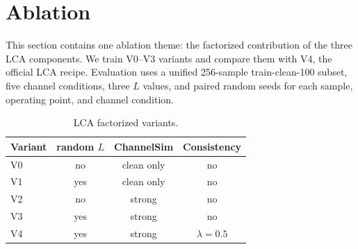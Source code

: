 ﻿\documentclass[conference]{IEEEtran}
\begin{document}
\begin{table}[t]
\centering
\caption{Three-client TCP prototype measurement. RTF entries are mean / worst endpoint mean.}
\label{tab:prototype}
\small
{}
\end{table}

\section{Ablation}

This section contains one ablation theme: the factorized contribution of the three LCA components. We train V0--V3 variants and compare them with V4, the official LCA recipe. Evaluation uses a unified 256-sample train-clean-100 subset, five channel conditions, three \(L\) values, and paired random seeds for each sample, operating point, and channel condition.

\begin{table}[t]
\centering
\caption{LCA factorized variants.}
\label{tab:variants}
\small
\begin{tabular}{lccc}
\toprule
Variant & random \(L\) & ChannelSim & Consistency \\
\midrule
V0 & no & clean only & no \\
V1 & yes & clean only & no \\
V2 & no & strong & no \\
V3 & yes & strong & no \\
V4 & yes & strong & \(\lambda=0.5\) \\
\bottomrule
\end{tabular}
\end{table}
\end{document}
